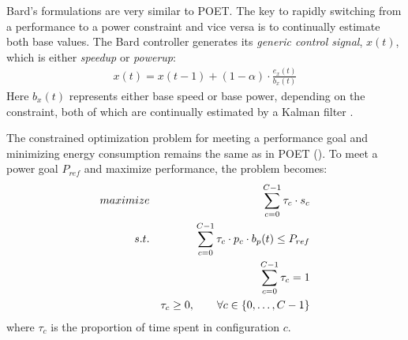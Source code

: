 Bard's formulations are very similar to POET.
The key to rapidly switching from a performance to a power constraint and vice versa is to continually estimate both base values.
The Bard controller generates its \emph{generic control signal}, $x(t)$, which is either \emph{speedup} or \emph{powerup}:
\begin{eqnarray}
  x(t) = x(t-1) + (1-\alpha) \cdot \frac{e_x(t)}{b_x(t)}
  \label{eqn:bard-xup-control}
\end{eqnarray}
Here $b_x(t)$ represents either base speed or base power, depending on the constraint, both of which are continually estimated by a Kalman filter \cite{welch2006kalman}.

The constrained optimization problem for meeting a performance goal and minimizing energy consumption remains the same as in POET ().
To meet a power goal $P_{ref}$ and maximize performance, the problem becomes:
\begin{eqnarray}
  \maximize && \sum_{c=0}^{C-1} \tau_c \cdot s_c \label{eqn:bard-timing} \\
  \st %
  && \sum_{c=0}^{C-1} \tau_c \cdot p_c \cdot b_p(t) \le P_{ref} \label{eqn:bard-power} \\
  && \sum_{c=0}^{C-1} \tau_c = 1 \label{eqn:work} \\
  && \tau_c \ge 0, \qquad \forall c \in \{0,\ldots,C-1\} \label{eqn:bard-time}
\end{eqnarray}
where $\tau_c$ is the proportion of time spent in configuration $c$.

